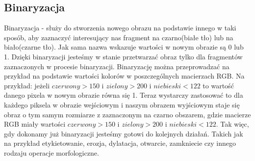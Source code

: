 \documentclass{article}
\begin{document}
        \subsection{Binaryzacja}
        {
            \label{sec:binaryzacja}
            \Large
            \justifying
            \quad
            Binaryzacja - służy do stworzenia nowego obrazu na podstawie innego w taki sposób, aby zaznaczyć interesujący nas fragment na czarno(białe tło)
            lub na biało(czarne tło). Jak sama nazwa wskazuje wartości w nowym obrazie są 0 lub 1. Dzięki binaryzacji jesteśmy w stanie przetwarzać obraz
            tylko dla fragmentów zaznaczonych w procesie binaryzacji. Binaryzację można przeprowadzać na przykład na podstawie wartości kolorów w poszczególnych
            macierzach RGB. Na przykład: 
            jeżeli \(czerwony > 150\) i \(zielony > 200\) i \(niebieski < 122\) to wartość danego pixela w nowym obrazie równa się 1.
            Teraz wystarczy zastosować to dla każdego piksela w obrazie wejściowym i naszym obrazem wyjściowym staje się obraz o tym samym rozmiarze
            z zaznaczonym na czarno obszarem, gdzie macierze RGB miały wartości \(czerwony > 150\) i \(zielony > 200\) i \(niebieski < 122\).
            Tak więc, gdy dokonamy już binaryzacji jesteśmy gotowi do kolejnych działań.
            Takich jak na przykład etykietowanie, erozja, dylatacja, otwarcie, zamkniecie czy innego rodzaju operacje morfologiczne. \cite{Digital Image Processing Second Edition}
        }
\end{document}

